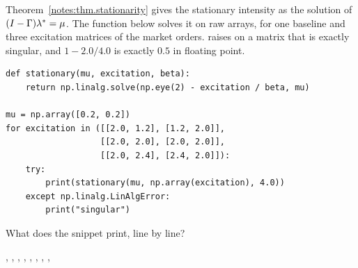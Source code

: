 \begin{question}
\label{question.fixedPointSolvedAtAndAboveCriticality}
Theorem~\ref{notes:thm.stationarity} gives the stationary intensity as the solution of
$(I - \Gamma)\lambda_{ }^{*} = \mu$.
The function below solves it on raw arrays,
for one baseline and three excitation matrices of the market orders.
 raises  on a matrix that is exactly singular,
and $1 - 2.0/4.0$ is exactly $0.5$ in floating point.
\begin{lstlisting}[caption={The fixed point, solved for three kernels}, label=listing.fixedPointSolvedAtAndAboveCriticality]
def stationary(mu, excitation, beta):
    return np.linalg.solve(np.eye(2) - excitation / beta, mu)

mu = np.array([0.2, 0.2])
for excitation in ([[2.0, 1.2], [1.2, 2.0]],
                   [[2.0, 2.0], [2.0, 2.0]],
                   [[2.0, 2.4], [2.4, 2.0]]):
    try:
        print(stationary(mu, np.array(excitation), 4.0))
    except np.linalg.LinAlgError:
        print("singular")
\end{lstlisting}
What does the snippet print, line by line?
\begin{choices}
 \correctchoice \codehl{[1. 1.]}, , \codehl{[-2. -2.]}
 \choice \codehl{[1. 1.]}, , 
 \choice \codehl{[1. 1.]}, , \codehl{[2. 2.]}
 \choice \codehl{[1. 1.]}, , \codehl{[-2. -2.]}
\end{choices}
\end{question}

